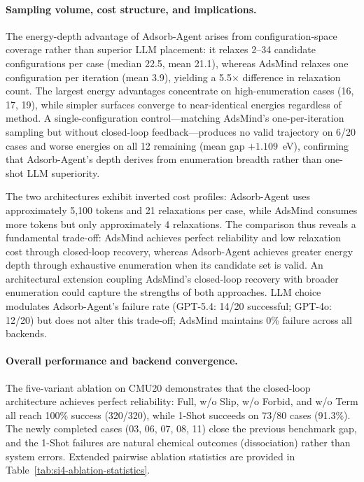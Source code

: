 \paragraph{Sampling volume, cost structure, and implications.}
The energy-depth advantage of Adsorb-Agent arises from configuration-space coverage rather than superior LLM placement: it relaxes 2--34 candidate configurations per case (median 22.5, mean 21.1), whereas AdsMind relaxes one configuration per iteration (mean 3.9), yielding a 5.5$\times$ difference in relaxation count.
The largest energy advantages concentrate on high-enumeration cases (16, 17, 19), while simpler surfaces converge to near-identical energies regardless of method.
A single-configuration control---matching AdsMind's one-per-iteration sampling but without closed-loop feedback---produces no valid trajectory on 6/20 cases and worse energies on all 12 remaining (mean gap $+1.109$~eV), confirming that Adsorb-Agent's depth derives from enumeration breadth rather than one-shot LLM superiority.

The two architectures exhibit inverted cost profiles: Adsorb-Agent uses approximately 5,100 tokens and 21 relaxations per case, while AdsMind consumes more tokens but only approximately 4 relaxations.
The comparison thus reveals a fundamental trade-off: AdsMind achieves perfect reliability and low relaxation cost through closed-loop recovery, whereas Adsorb-Agent achieves greater energy depth through exhaustive enumeration when its candidate set is valid.
An architectural extension coupling AdsMind's closed-loop recovery with broader enumeration could capture the strengths of both approaches.
LLM choice modulates Adsorb-Agent's failure rate (GPT-5.4: 14/20 successful; GPT-4o: 12/20) but does not alter this trade-off; AdsMind maintains 0\% failure across all backends.

\paragraph{Overall performance and backend convergence.}
The five-variant ablation on CMU20 demonstrates that the closed-loop architecture achieves perfect reliability: Full, w/o Slip, w/o Forbid, and w/o Term all reach 100\% success (320/320), while 1-Shot succeeds on 73/80 cases (91.3\%).
The newly completed cases (03, 06, 07, 08, 11) close the previous benchmark gap, and the 1-Shot failures are natural chemical outcomes (dissociation) rather than system errors.
Extended pairwise ablation statistics are provided in Table~\ref{tab:si4-ablation-statistics}.

